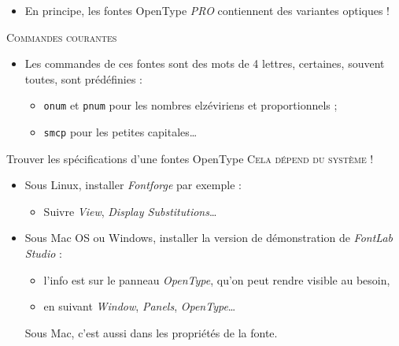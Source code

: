 \documentclass[12pt,a4paper,twocolumn]{book} %
\def\ogla{{\fontfamily{fi4}\selectfont<<}}
\def\fgla{{\fontfamily{fi4}\selectfont>>}}
\begin{document}
{\begin{itemize}
				            {\selectfont\itshape
				              Quelles= superbes= questions= !}




				            Regardez attentivement petites capitales penchées et les \ogla s \fgla !

				            Il faut, bien sûr, que la fonte considérée le permette !
				          \item  En principe, les fontes OpenType \textit{PRO} contiennent des variantes optiques !
                                          \end{itemize}
                                          {\textsc{Commandes courantes}}

			                  \begin{itemize}
				          \item Les commandes de ces fontes sont des mots de 4 lettres, certaines, souvent toutes, sont prédéfinies :
				            \begin{itemize}
					    \item \texttt{onum} et \texttt{pnum} pour les nombres elzéviriens et proportionnels ;
					    \item \texttt{smcp} pour les petites capitales\dots
				            \end{itemize}
			                  \end{itemize}


	                                  {Trouver les spécifications d'une fontes OpenType}
                                          {\textsc{Cela dépend du système !}}
                                          \begin{itemize}
                                          \item Sous Linux, installer \textit{Fontforge} par exemple :
			                    \begin{itemize}
				            \item Suivre \textit{View}, \textit{Display Substitutions}\dots
			                    \end{itemize}
	                                  \item Sous Mac OS ou Windows, installer la version de démonstration de \textit{FontLab Studio} :
			                    \begin{itemize}
				            \item l'info est sur le panneau \textit{OpenType}, qu'on peut rendre visible au besoin,
				            \item en suivant \textit{Window}, \textit{Panels}, \textit{OpenType}\dots
			                    \end{itemize}
			                    Sous Mac, c'est aussi dans les propriétés de la fonte.
	                                  \end{itemize}


}
\end{document}
